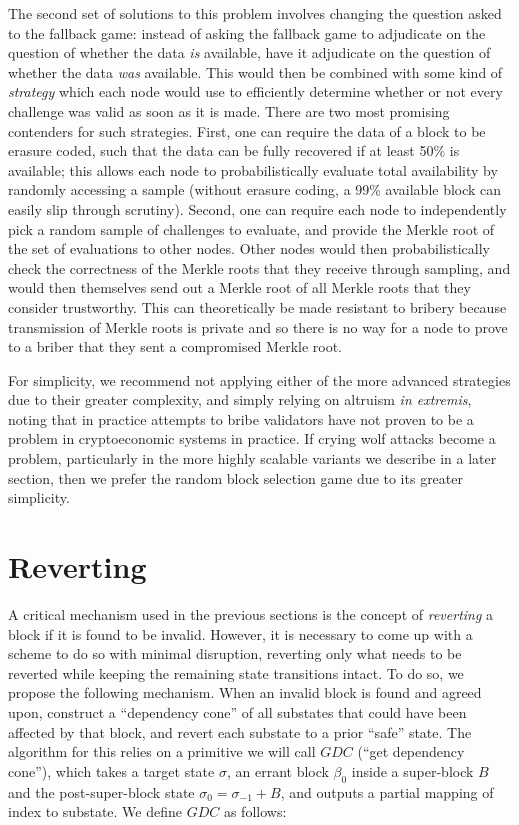 \documentclass[11pt,a4paper]{report}
\theoremstyle{plain}
\theoremstyle{definition}
\theoremstyle{remark}
\begin{document}
The second set of solutions to this problem involves changing the question asked to the fallback game: instead of asking the fallback game to adjudicate on the question of whether the data \emph{is} available, have it adjudicate on the question of whether the data \emph{was} available. This would then be combined with some kind of \emph{strategy} which each node would use to efficiently determine whether or not every challenge was valid as soon as it is made. There are two most promising contenders for such strategies. First, one can require the data of a block to be erasure coded, such that the data can be fully recovered if at least 50\% is available; this allows each node to probabilistically evaluate total availability by randomly accessing a sample (without erasure coding, a 99\% available block can easily slip through scrutiny). Second, one can require each node to independently pick a random sample of challenges to evaluate, and provide the Merkle root of the set of evaluations to other nodes. Other nodes would then probabilistically check the correctness of the Merkle roots that they receive through sampling, and would then themselves send out a Merkle root of all Merkle roots that they consider trustworthy. This can theoretically be made resistant to bribery because transmission of Merkle roots is private and so there is no way for a node to prove to a briber that they sent a compromised Merkle root.

For simplicity, we recommend not applying either of the more advanced strategies due to their greater complexity, and simply relying on altruism \emph{in extremis}, noting that in practice attempts to bribe validators have not proven to be a problem in cryptoeconomic systems in practice. If crying wolf attacks become a problem, particularly in the more highly scalable variants we describe in a later section, then we prefer the random block selection game due to its greater simplicity.

\chapter{Reverting}

A critical mechanism used in the previous sections is the concept of \emph{reverting} a block if it is found to be invalid. However, it is necessary to come up with a scheme to do so with minimal disruption, reverting only what needs to be reverted while keeping the remaining state transitions intact. To do so, we propose the following mechanism. When an invalid block is found and agreed upon, construct a ``dependency cone'' of all substates that could have been affected by that block, and revert each substate to a prior ``safe'' state. The algorithm for this relies on a primitive we will call $GDC$ (``get dependency cone''), which takes a target state $\sigma$, an errant block $\beta_0$ inside a super-block $B$ and the post-super-block state $\sigma_0 = \sigma_{-1} + B$, and outputs a partial mapping of index to substate. We define $GDC$ as follows:
\end{document}
